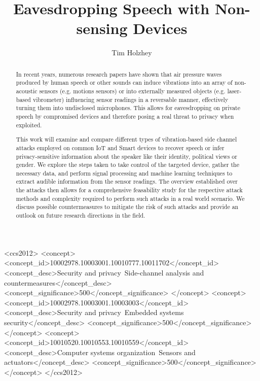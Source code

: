 \documentclass[sigconf, nonacm]{acmart}
\begin{document}
\title{Eavesdropping Speech with Non-sensing Devices}

\author{Tim Holzhey}

\begin{abstract}
  In recent years, numerous research papers have shown that air pressure waves produced by human speech or other sounds can induce vibrations into an array of non-acoustic sensors (e.g. motions sensors) or into externally measured objects (e.g. laser-based vibrometer) influencing sensor readings in a reversable manner, effectively turning them into undisclosed microphones.
  This allows for eavesdropping on private speech by compromised devices and therefore posing a real threat to privacy when exploited.
  
  This work will examine and compare different types of vibration-based side channel attacks employed on common IoT and Smart devices to recover speech or infer privacy-sensitive information about the speaker like their identity, political views or gender.
  We explore the steps taken to take control of the targeted device, gather the necessary data, and perform signal processing and machine learning techniques to extract audible information from the sensor readings.
  The overview established over the attacks then allows for a comprehensive feasability study for the respective attack methods and complexity required to perform such attacks in a real world scenario. 
  We discuss possible countermeasures to mitigate the risk of such attacks and provide an outlook on future research directions in the field.
\end{abstract}

\begin{CCSXML}
  <ccs2012>
  <concept>
  <concept_id>10002978.10003001.10010777.10011702</concept_id>
  <concept_desc>Security and privacy~Side-channel analysis and countermeasures</concept_desc>
  <concept_significance>500</concept_significance>
  </concept>
  <concept>
  <concept_id>10002978.10003001.10003003</concept_id>
  <concept_desc>Security and privacy~Embedded systems security</concept_desc>
  <concept_significance>500</concept_significance>
  </concept>
  <concept>
  <concept_id>10010520.10010553.10010559</concept_id>
  <concept_desc>Computer systems organization~Sensors and actuators</concept_desc>
  <concept_significance>500</concept_significance>
  </concept>
  </ccs2012>
\end{CCSXML}
\end{document}
